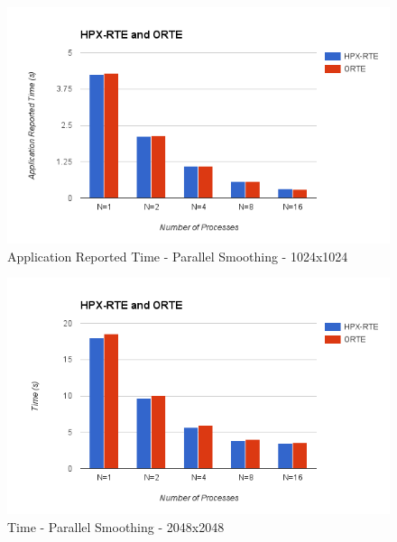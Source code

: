 \begin{figure}[h!]
  \centering
  \includegraphics[scale=0.7]{images/time-app-smoother-1024-infiniband.png}
  \caption[Application Reported Time - Parallel Smoothing - 1024x1024]{Application Reported Time - Parallel Smoothing - 1024x1024}
  \label{fig:time-app-smoother-1024-infiniband}
\end{figure}


\begin{figure}[h!]
  \centering
  \includegraphics[scale=0.7]{images/time-all-smoother-2048-infiniband.png}
  \caption[Time - Parallel Smoothing - 2048x2048]{Time - Parallel Smoothing - 2048x2048}
  \label{fig:time-all-smoother-2048-infiniband}
\end{figure}

